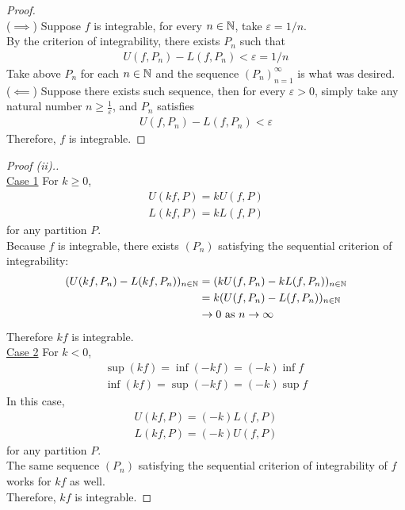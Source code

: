 \documentclass[11pt]{article}
\begin{document}
	\begin{proof} \quad \\
		($\implies$) Suppose $f$ is integrable, for every $n \in \mathbb{N}$, take $\varepsilon = 1/n$. \\
		By the criterion of integrability, there exists $P_n$ such that
		\begin{align}
			U(f, P_n) - L(f, P_n) < \varepsilon = 1/n
		\end{align}
		Take above $P_n$ for each $n \in \mathbb{N}$ and the sequence $(P_n)_{n=1}^\infty$ is what was desired. \\
		($\impliedby$) Suppose there exists such sequence, then for every $\varepsilon > 0$, simply take any natural number $n \geq \frac{1}{\varepsilon}$, and $P_n$ satisfies
		\begin{align}
			U(f, P_n) - L(f, P_n) < \varepsilon
		\end{align}
		Therefore, $f$ is integrable.
	\end{proof}
	
	\begin{proof}[Proof (ii).] \quad \\
		\ul{Case 1} For $k \geq 0$,
		\begin{align}
			U(kf, P) = kU(f, P) \\
			L(kf, P) = kL(f, P)
		\end{align}
		for any partition $P$. \\
		Because $f$ is integrable, there exists $(P_n)$ satisfying the sequential criterion of integrability:
		\begin{align}
			(U(kf, P_n) - L(kf, P_n))_{n \in \mathbb{N}} &= (kU(f, P_n) - kL(f, P_n))_{n \in \mathbb{N}} \\
			&= k (U(f, P_n) - L(f, P_n))_{n \in \mathbb{N}} \\
			&\to 0 \text{{ as }} n \to \infty
		\end{align}
		Therefore $kf$ is integrable. \\
		\ul{Case 2} For $k < 0$,
		\begin{align}
			\sup (kf) = \inf(-kf) = (-k) \inf f \\
			\inf (kf) = \sup(-kf) = (-k) \sup f
		\end{align}
		In this case, 
		\begin{align}
			U(kf, P) = (-k)L(f, P) \\
			L(kf, P) = (-k)U(f, P)
		\end{align}
		for any partition $P$. \\
		The same sequence $(P_n)$ satisfying the sequential criterion of integrability of $f$ works for $kf$ as well. \\
		Therefore, $kf$ is integrable.
	\end{proof}
	
\end{document}
